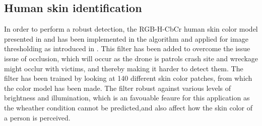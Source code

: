 \subsection{Human skin identification}
In order to perform a robust detection, the RGB-H-CbCr human skin color model presented in \cite{Ref:SkinColorModel} and \cite{Ref:SkinDetection} has been implemented in the algorithm and applied for image thresholding as introduced in \cite{Ref:SkinDetection}. This filter has been added to overcome the issue issue of occlusion, which will occur as the drone is patrols crash site and wreckage might occlur with victims, and thereby making it harder to detect them. The filter has been trained by looking at 140 different skin color patches, from which the color model has been made. The filter robust against  various levels of brightness and illumination, which is an favouable feaure for this application as the wheather condition cannot be predicted,and also affect how the skin color of a person is perceived. 


